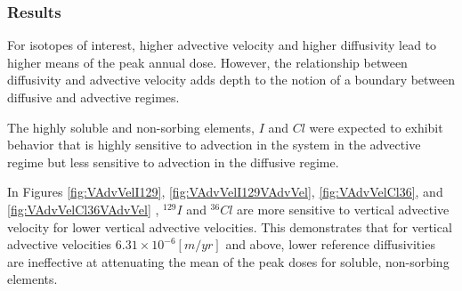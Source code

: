 \subsubsection{Results}

For isotopes of interest, higher advective velocity and higher diffusivity lead to higher 
means of the peak annual dose. However, the relationship between diffusivity and 
advective velocity adds depth to the notion of a boundary between diffusive and 
advective regimes.

The highly soluble and non-sorbing elements, $I$ and $Cl$ 
were expected to exhibit behavior that is highly sensitive 
to advection in the system in the advective regime but less sensitive to 
advection in the diffusive regime.  

In Figures \ref{fig:VAdvVelI129}, \ref{fig:VAdvVelI129VAdvVel}, 
\ref{fig:VAdvVelCl36}, and \ref{fig:VAdvVelCl36VAdvVel} , $^{129}I$ and 
$^{36}Cl$ are more sensitive to vertical advective velocity for lower vertical 
advective velocities. This demonstrates that for vertical advective velocities 
$6.31\times10^{-6}[m/yr]$ and above, lower reference diffusivities are 
ineffective at attenuating the mean of the peak doses for soluble, non-sorbing 
elements. 

